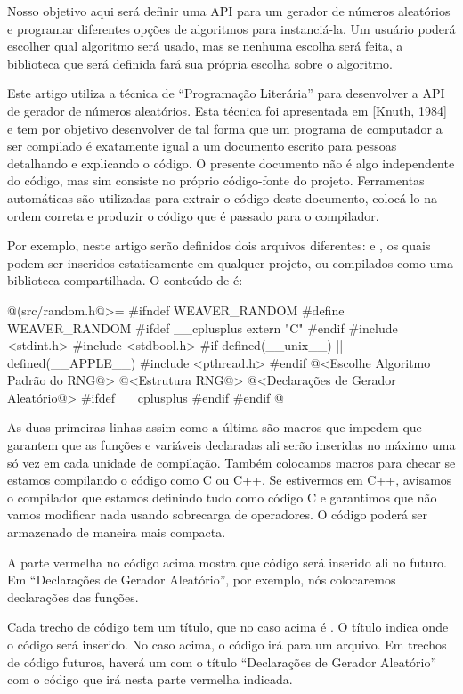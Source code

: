 Nosso objetivo aqui será definir uma API para um gerador de números
aleatórios e programar diferentes opções de algoritmos para
instanciá-la. Um usuário poderá escolher qual algoritmo será usado,
mas se nenhuma escolha será feita, a biblioteca que será definida fará
sua própria escolha sobre o algoritmo.


Este artigo utiliza a técnica de ``Programação Literária'' para
desenvolver a API de gerador de números aleatórios. Esta técnica foi
apresentada em [Knuth, 1984] e tem por objetivo desenvolver
 de tal forma que um programa de computador a ser compilado
é exatamente igual a um documento escrito para pessoas detalhando e
explicando o código. O presente documento não é algo independente do
código, mas sim consiste no próprio código-fonte do projeto.
Ferramentas automáticas são utilizadas para extrair o código deste
documento, colocá-lo na ordem correta e produzir o código que é
passado para o compilador.

Por exemplo, neste artigo serão definidos dois arquivos
diferentes:  e , os quais
podem ser inseridos estaticamente em qualquer projeto, ou compilados
como uma biblioteca compartilhada. O conteúdo de 
é:

\iniciocodigo
@(src/random.h@>=
#ifndef WEAVER_RANDOM
#define WEAVER_RANDOM
#ifdef __cplusplus
extern "C" {
#endif
#include <stdint.h>
#include <stdbool.h>
#if defined(__unix__) || defined(__APPLE__)
#include <pthread.h>
#endif
@<Escolhe Algoritmo Padrão do RNG@>
@<Estrutura RNG@>
@<Declarações de Gerador Aleatório@>
#ifdef __cplusplus
}
#endif
#endif
@
\fimcodigo

As duas primeiras linhas assim como a última são macros que impedem
que garantem que as funções e variáveis declaradas ali serão inseridas
no máximo uma só vez em cada unidade de compilação. Também colocamos
macros para checar se estamos compilando o código como C ou C++. Se
estivermos em C++, avisamos o compilador que estamos definindo tudo
como código C e garantimos que não vamos modificar nada usando
sobrecarga de operadores. O código poderá ser armazenado de maneira
mais compacta.

A parte vermelha no código acima mostra que código será inserido ali
no futuro. Em ``Declarações de Gerador Aleatório'', por exemplo, nós
colocaremos declarações das funções.

Cada trecho de código tem um título, que no caso acima
é . O título indica onde o código será
inserido. No caso acima, o código irá para um arquivo. Em trechos de
código futuros, haverá um com o título ``Declarações de Gerador
Aleatório'' com o código que irá nesta parte vermelha indicada.

